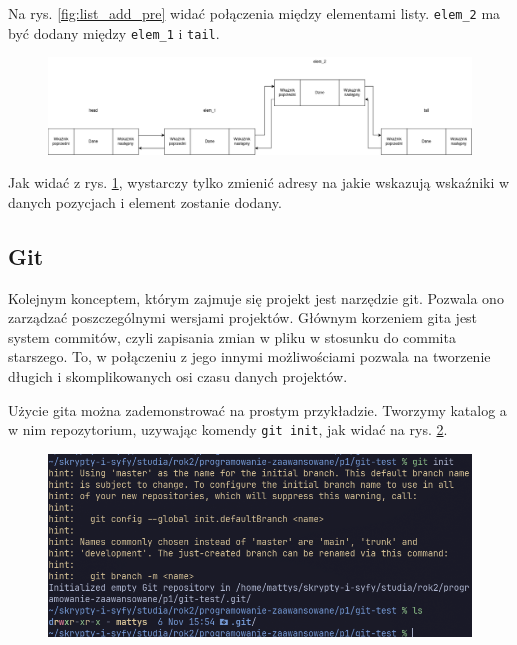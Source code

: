 Na rys. \ref{fig:list_add_pre} widać połączenia między elementami listy. \texttt{elem\_2} ma być dodany między \texttt{elem\_1} i \texttt{tail}. 

\begin{figure}[H]
	\centering
	\includegraphics[width=1\textwidth]{images/listadodanie_post.drawio.png}
	\caption{}
	\label{fig:list_add_post}
\end{figure}

Jak widać z rys. \ref{fig:list_add_post}, wystarczy tylko zmienić adresy na jakie wskazują wskaźniki w danych pozycjach i element zostanie dodany.

\subsection{Git}
Kolejnym konceptem, którym zajmuje się projekt jest narzędzie git\cite{gitsite}. Pozwala ono zarządzać poszczególnymi wersjami projektów. Głównym korzeniem gita jest system commitów, czyli zapisania zmian w pliku w stosunku do commita starszego. To, w połączeniu z jego innymi możliwościami pozwala na tworzenie długich i skomplikowanych osi czasu danych projektów. 

Użycie gita można zademonstrować na prostym przykładzie. Tworzymy katalog a w nim repozytorium, uzywając komendy \texttt{git init}, jak widać na rys. \ref{fig:git_init}.

\begin{figure}[H]
	\centering
	\includegraphics[width=1\textwidth]{images/git_init.png}
	\caption{}
	\label{fig:git_init}
\end{figure}

